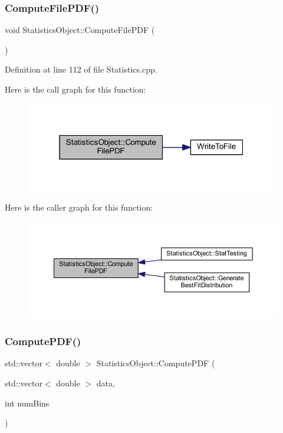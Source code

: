 \subsubsection{\texorpdfstring{Compute\+File\+P\+D\+F()}{ComputeFilePDF()}}
{\footnotesize\ttfamily void Statistics\+Object\+::\+Compute\+File\+P\+DF (\begin{DoxyParamCaption}{ }\end{DoxyParamCaption})}



Definition at line 112 of file Statistics.\+cpp.

Here is the call graph for this function\+:\nopagebreak
\begin{figure}[H]
\begin{center}
\leavevmode
\includegraphics[width=313pt]{class_statistics_object_a7954e7f69391099bbc33c139149ebb15_cgraph}
\end{center}
\end{figure}
Here is the caller graph for this function\+:\nopagebreak
\begin{figure}[H]
\begin{center}
\leavevmode
\includegraphics[width=350pt]{class_statistics_object_a7954e7f69391099bbc33c139149ebb15_icgraph}
\end{center}
\end{figure}
\mbox{\label{class_statistics_object_ad89d69d36051851fe876b1ec28967c1e}} 
\subsubsection{\texorpdfstring{Compute\+P\+D\+F()}{ComputePDF()}}
{\footnotesize\ttfamily std\+::vector$<$ double $>$ Statistics\+Object\+::\+Compute\+P\+DF (\begin{DoxyParamCaption}\item[{std\+::vector$<$ double $>$}]{data,  }\item[{int}]{num\+Bins }\end{DoxyParamCaption})}



